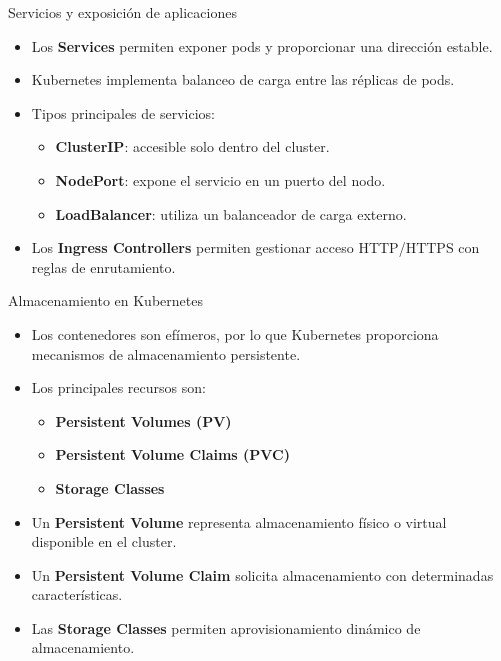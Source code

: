 \documentclass{beamer}
\begin{document}
\begin{frame}{Servicios y exposición de aplicaciones}
\begin{itemize}
\item Los \textbf{Services} permiten exponer pods y proporcionar una dirección estable.
\item Kubernetes implementa balanceo de carga entre las réplicas de pods.
\item Tipos principales de servicios:
\begin{itemize}
\item \textbf{ClusterIP}: accesible solo dentro del cluster.
\item \textbf{NodePort}: expone el servicio en un puerto del nodo.
\item \textbf{LoadBalancer}: utiliza un balanceador de carga externo.
\end{itemize}
\item Los \textbf{Ingress Controllers} permiten gestionar acceso HTTP/HTTPS con reglas de enrutamiento.
\end{itemize}
\end{frame}

\begin{frame}{Almacenamiento en Kubernetes}
\begin{itemize}
\item Los contenedores son efímeros, por lo que Kubernetes proporciona mecanismos de almacenamiento persistente.
\item Los principales recursos son:
\begin{itemize}
\item \textbf{Persistent Volumes (PV)}
\item \textbf{Persistent Volume Claims (PVC)}
\item \textbf{Storage Classes}
\end{itemize}
\item Un \textbf{Persistent Volume} representa almacenamiento físico o virtual disponible en el cluster.
\item Un \textbf{Persistent Volume Claim} solicita almacenamiento con determinadas características.
\item Las \textbf{Storage Classes} permiten aprovisionamiento dinámico de almacenamiento.
\end{itemize}
\end{frame}
\end{document}
